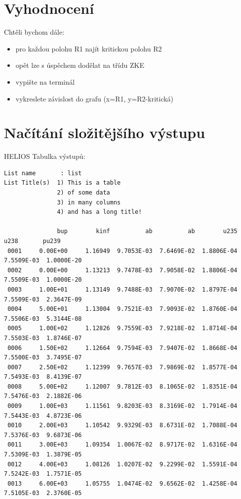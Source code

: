 \documentclass{beamer}
\begin{document}
\section{Vyhodnocení}

\begin{frame}
  Chtěli bychom dále:
  \begin{itemize}
    \item pro každou polohu R1 najít kritickou polohu R2
    \item opět lze s úspěchem dodělat na třídu ZKE
    \item vypište na terminál
    \item vykreslete závislost do grafu (x=R1, y=R2-kritická)   
  \end{itemize}
\end{frame}


\section{Načítání složitějšího výstupu}

\begin{frame}[fragile]{HELIOS}
  Tabulka výstupů:
  \scriptsize
  \begin{verbatim}
List name       : list
List Title(s)  1) This is a table
               2) of some data
               3) in many columns
               4) and has a long title!

               bup        kinf          ab          ab        u235        u238       pu239
 0001     0.00E+00     1.16949  9.7053E-03  7.6469E-02  1.8806E-04  7.5509E-03  1.0000E-20
 0002     0.00E+00     1.13213  9.7478E-03  7.9058E-02  1.8806E-04  7.5509E-03  1.0000E-20
 0003     1.00E+01     1.13149  9.7488E-03  7.9070E-02  1.8797E-04  7.5509E-03  2.3647E-09
 0004     5.00E+01     1.13004  9.7521E-03  7.9093E-02  1.8760E-04  7.5506E-03  5.3144E-08
 0005     1.00E+02     1.12826  9.7559E-03  7.9218E-02  1.8714E-04  7.5503E-03  1.8746E-07
 0006     1.50E+02     1.12664  9.7594E-03  7.9407E-02  1.8668E-04  7.5500E-03  3.7495E-07
 0007     2.50E+02     1.12399  9.7657E-03  7.9869E-02  1.8577E-04  7.5493E-03  8.4139E-07
 0008     5.00E+02     1.12007  9.7812E-03  8.1065E-02  1.8351E-04  7.5476E-03  2.1882E-06
 0009     1.00E+03     1.11561  9.8203E-03  8.3169E-02  1.7914E-04  7.5443E-03  4.8723E-06
 0010     2.00E+03     1.10542  9.9329E-03  8.6731E-02  1.7088E-04  7.5376E-03  9.6873E-06
 0011     3.00E+03     1.09354  1.0067E-02  8.9717E-02  1.6316E-04  7.5309E-03  1.3879E-05
 0012     4.00E+03     1.08126  1.0207E-02  9.2299E-02  1.5591E-04  7.5242E-03  1.7571E-05
 0013     6.00E+03     1.05755  1.0474E-02  9.6562E-02  1.4258E-04  7.5105E-03  2.3760E-05
  \end{verbatim}
\end{frame}
\end{document}
